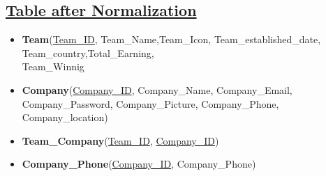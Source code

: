 \subsection*{\underline{Table after Normalization}}
\begin{itemize}
    \item \textbf{Team}(\underline{Team\_ID}, Team\_Name,Team\_Icon, Team\_established\_date, Team\_country,Total\_Earning,\\Team\_Winnig
    \item \textbf{Company}(\underline{Company\_ID}, Company\_Name, Company\_Email, Company\_Password, Company\_Picture, Company\_Phone, Company\_location)
    \item \textbf{Team\_Company}(\underline{Team\_ID}, \underline{Company\_ID})
    \item \textbf{Company\_Phone}(\underline{Company\_ID}, Company\_Phone)
\end{itemize}


\clearpage
